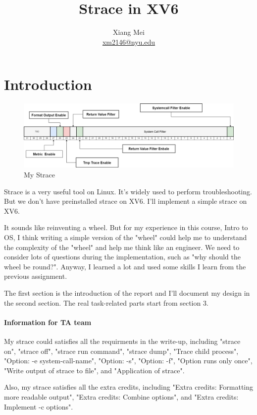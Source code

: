 \documentclass[11pt,oneside,a4paper]{article}
\title{Strace in XV6}
\author{Xiang Mei \\ \href{mailto:xm2146@nyu.edu}{xm2146@nyu.edu} }
\begin{document}
\maketitle
\section{Introduction}

\begin{figure}[H]
    \includegraphics[width=4.75in]{pstrace.png}
    \centering
    \caption{My Strace}
\end{figure}

Strace is a very useful tool on Linux. It's widely used to perform troubleshooting.
But we don't have preinstalled strace on XV6. I'll implement a simple strace on XV6.

It sounds like reinventing a wheel. But for my experience in this course, Intro to OS,
I think writing a simple version of the "wheel" could help me to understand the
complexity of the "wheel" and help me think like an engineer. We need to consider
lots of questions during the implementation, such as "why should the wheel be 
round?". Anyway, I learned a lot and used some skills I learn from the previous assignment.

The first section is the introduction of the report and I'll document my design in the
second section. The real task-related parts start from section 3.

\paragraph*{Information for TA team}

My strace could satisfies all the requirments in the write-up, including
"strace on", "strace off", "strace run command", "strace dump", "Trace child process", 
"Option: -e system-call-name", "Option: -s", "Option: -f", 
"Option runs only once", "Write output of strace to file", and "Application of strace".

Also, my strace satisfies all the extra credits, including 
"Extra credits: Formatting more readable output", 
"Extra credits: Combine options", and 
"Extra credits: Implement -c options".
\end{document}
